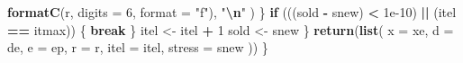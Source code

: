 \documentclass[
  12pt,
]{article}
\newenvironment{Shaded}{\begin{snugshade}}{\end{snugshade}}
\newcommand{\AttributeTok}[1]{\textcolor[rgb]{0.13,0.29,0.53}{#1}}
\newcommand{\ControlFlowTok}[1]{\textcolor[rgb]{0.13,0.29,0.53}{\textbf{#1}}}
\newcommand{\DecValTok}[1]{\textcolor[rgb]{0.00,0.00,0.81}{#1}}
\newcommand{\FloatTok}[1]{\textcolor[rgb]{0.00,0.00,0.81}{#1}}
\newcommand{\FunctionTok}[1]{\textcolor[rgb]{0.13,0.29,0.53}{\textbf{#1}}}
\newcommand{\NormalTok}[1]{#1}
\newcommand{\OtherTok}[1]{\textcolor[rgb]{0.56,0.35,0.01}{#1}}
\newcommand{\SpecialCharTok}[1]{\textcolor[rgb]{0.81,0.36,0.00}{\textbf{#1}}}
\newcommand{\StringTok}[1]{\textcolor[rgb]{0.31,0.60,0.02}{#1}}
\begin{document}
\begin{Shaded}
\begin{Highlighting}[]
          \FunctionTok{formatC}\NormalTok{(r, }\AttributeTok{digits =} \DecValTok{6}\NormalTok{, }\AttributeTok{format =} \StringTok{"f"}\NormalTok{),}
          \StringTok{"}\SpecialCharTok{\textbackslash{}n}\StringTok{"}
\NormalTok{        )}
\NormalTok{      \}}
      \ControlFlowTok{if}\NormalTok{ (((sold }\SpecialCharTok{{-}}\NormalTok{ snew) }\SpecialCharTok{\textless{}} \FloatTok{1e{-}10}\NormalTok{) }\SpecialCharTok{||}\NormalTok{ (itel }\SpecialCharTok{==}\NormalTok{ itmax)) \{}
        \ControlFlowTok{break}
\NormalTok{      \}}
\NormalTok{      itel }\OtherTok{\textless{}{-}}\NormalTok{ itel }\SpecialCharTok{+} \DecValTok{1}
\NormalTok{      sold }\OtherTok{\textless{}{-}}\NormalTok{ snew}
\NormalTok{    \}}
    \FunctionTok{return}\NormalTok{(}\FunctionTok{list}\NormalTok{(}
      \AttributeTok{x =}\NormalTok{ xe,}
      \AttributeTok{d =}\NormalTok{ de,}
      \AttributeTok{e =}\NormalTok{ ep,}
      \AttributeTok{r =}\NormalTok{ r,}
      \AttributeTok{itel =}\NormalTok{ itel,}
      \AttributeTok{stress =}\NormalTok{ snew}
\NormalTok{    ))}
\NormalTok{  \}}
\end{Highlighting}
\end{Shaded}
\end{document}
